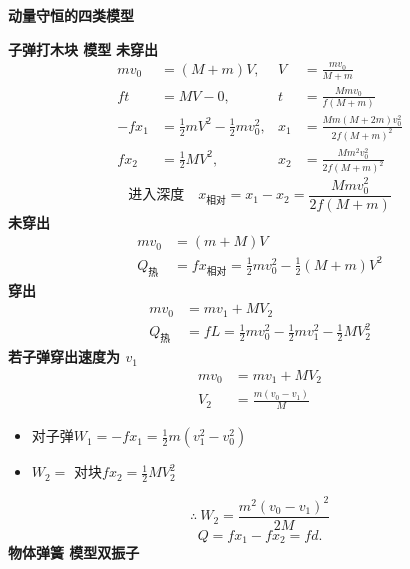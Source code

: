 \textbf{动量守恒的四类模型}

\textbf{子弹打木块 模型}
\textbf{未穿出}
\begin{align*}
mv_0&=(M+m)V, & V&=\frac{mv_0}{M+m}\\
ft&=MV-0, & t&=\frac{Mmv_0}{f(M+m)}\\ %
-fx_1&=\tfrac12 mV^2-\tfrac12 mv_0^2, & x_1&=\frac{Mm(M+2m)v_0^2}{2f(M+m)^2}\\ %
fx_2&=\tfrac12 MV^2, & x_2&=\frac{Mm^2v_0^2}{2f(M+m)^2}
\end{align*}
\[ \text{进入深度}\quad x_{\text{相对}}=x_1-x_2=\frac{Mmv_0^2}{2f(M+m)} \]
\textbf{未穿出}
\begin{align*}
mv_0&=(m+M)V\\
Q_{\text{热}}&=fx_{\text{相对}}=\tfrac12 mv_0^2-\tfrac12(M+m)V^2
\end{align*}
\textbf{穿出}
\begin{align*}
mv_0&=mv_1+MV_2\\
Q_{\text{热}}&=fL=\tfrac12 mv_0^2-\tfrac12 mv_1^2-\tfrac12 MV_2^2
\end{align*}
\textbf{若子弹穿出速度为 $v_1$}
\begin{align*}
mv_0&=mv_1+MV_2\\
V_2&=\frac{m(v_0-v_1)}{M}
\end{align*}
\begin{itemize}
\item 对子弹\quad $W_1=-fx_1=\tfrac12 m(v_1^2-v_0^2)$
\item $W_2=$ 对块\quad $fx_2=\tfrac12 MV_2^2$
\end{itemize}
\[ \therefore\ W_2=\frac{m^2(v_0-v_1)^2}{2M} \]
\[ Q=fx_1-fx_2=fd. \]
\textbf{物体弹簧 模型\quad 双振子}
